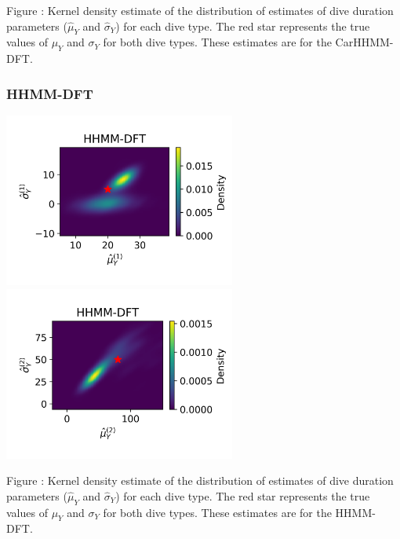 \documentclass{article}
\begin{document}
        \noindent Figure : Kernel density estimate of the distribution of estimates of dive duration parameters ($\hat \mu_Y$ and $\hat \sigma_Y$) for each dive type. The red star represents the true values of $\mu_Y$ and $\sigma_Y$ for both dive types. These estimates are for the CarHHMM-DFT.
        \addtocounter{fignum}{1}
        
        \subsubsection{HHMM-DFT}
        \begin{center}
        \includegraphics[width=3in]{../Plots/hhmm_FV_uncorr_MLE_density_dive_duration_-1_0.png}
        \includegraphics[width=3in]{../Plots/hhmm_FV_uncorr_MLE_density_dive_duration_-1_1.png}
        \end{center}

        \noindent Figure : Kernel density estimate of the distribution of estimates of dive duration parameters ($\hat \mu_Y$ and $\hat \sigma_Y$) for each dive type. The red star represents the true values of $\mu_Y$ and $\sigma_Y$ for both dive types. These estimates are for the HHMM-DFT.
        \addtocounter{fignum}{1}
        
\end{document}
